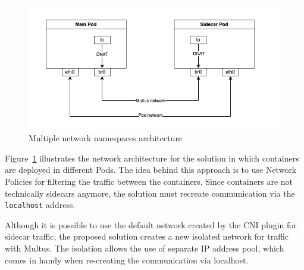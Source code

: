 \documentclass[english, 12pt, a4paper, sci, utf8, a-2b, online]{aaltothesis}
\begin{document}




\begin{figure}[h!]
  \centering
  \includegraphics[width=\linewidth]{files/multus.png}
  \caption{Multiple network namespaces architecture}
  \label{fig:multi-pod-net-solution}
\end{figure}
Figure~\ref{fig:multi-pod-net-solution} illustrates the network architecture for the solution in which containers are deployed in different Pods.
The idea behind this approach is to use Network Policies for filtering the traffic between the containers.
Since containers are not technically sidecars anymore, the solution must recreate communication via the \texttt{localhost} address.

Although it is possible to use the default network created by the CNI plugin for sidecar traffic, the proposed solution creates a new isolated network for traffic with Multus.
The isolation allows the use of separate IP address pool, which comes in handy when re-creating the communication via localhost.
\end{document}

